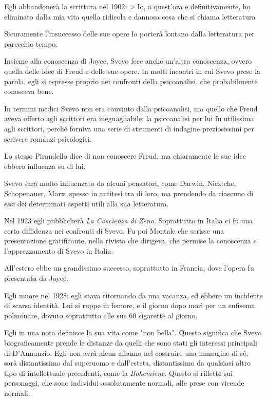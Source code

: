 Egli abbandonerà la scrittura nel 1902:
> Io, a quest'ora e definitivamente, ho eliminato dalla mia vita quella ridicola e dannosa cosa che si chiama letteratura

Sicuramente l'insuccesso delle sue opere lo porterà lontano dalla letteratura per parecchio tempo.

Insieme alla conoscenza di Joyce, Svevo fece anche un'altra conoscenza, ovvero quella delle idee di Freud e delle sue opere.
In molti incontri in cui Svevo prese la parola, egli si espresse proprio nei confronti della psicoanalisi, che probabilmente conosceva bene.

In termini medici Svevo non era convinto dalla psicoanalisi, ma quello che Freud aveva offerto agli scrittori era ineguagliabile: la psicoanalisi per lui fu utilissima agli scrittori, perché forniva una serie di strumenti di indagine preziosissimi per scrivere romanzi psicologici.

Lo stesso Pirandello dice di non conoscere Freud, ma chiaramente le sue idee ebbero influenza su di lui.

Svevo sarà molto influenzato da alcuni pensatori, come Darwin, Nieztche, Schopenauer, Marx, spesso in antitesi tra di loro, ma prendendo da ciascuno di essi dei determinati aspetti utili alla sua letteratura.

Nel 1923 egli pubblicherà \textit{La Coscienza di Zeno}. Soprattutto in Italia ci fu una certa diffidenza nei confronti di Svevo. Fu poi Montale che scrisse una presentazione gratificante, nella rivista che dirigeva, che permise la conoscenza e l'apprezzamento di Svevo in Italia.

All'estero ebbe un grandissimo successo, soprattutto in Francia, dove l'opera fu presentata da Joyce.

Egli muore nel 1928: egli stava ritornando da una vacanza, ed ebbero un incidente di scarsa identità. Lui si ruppe in femore, e il giorno dopo morì per un enfisema polmonare, dovuto soprattutto alle sue 60 sigarette al giorno.

Egli in una nota definisce la sua vita come "non bella". Questo significa che Svevo biograficamente prende le distanze da quelli che sono stati gli interessi principali di D'Annunzio.
Egli non avrà alcun affanno nel costruire una immagine di sé, sarà distantissimo dal superuomo e dall'esteta, distantissimo da qualsiasi altro tipo di intellettuale precedenti, come la \textit{Bohemiene}. Questo si riflette sui personaggi, che sono individui assolutamente normali, alle prese con vicende normali.

